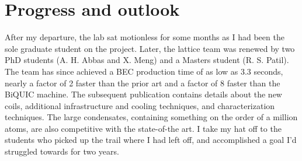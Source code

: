 

\section{Progress and outlook}
	
	After my departure, the lab sat motionless for some months as I had been the sole graduate student on the project.
	Later, the \mhe lattice team was renewed by two PhD students (A. H.	Abbas and X. Meng) and a Masters student (R. S. Patil).
	The team has since achieved a BEC production time of as low as 3.3 seconds, nearly a factor of 2 faster than the prior art \cite{Bouton15} and a factor of 8 faster than the BiQUIC machine.
	The subsequent publication \cite{Abbas21} contains details about the new coils, additional infrastructure and cooling techniques, and characterization techniques.
	The large condensates, containing something on the order of a million atoms, are also competitive with the state-of-the art.
	I take my hat off to the students who picked up the trail where I had left off, and accomplished a goal I'd struggled towards for two years.
	



